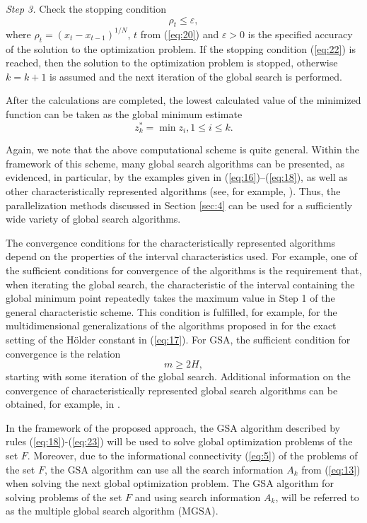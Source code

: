 \documentclass[review]{elsarticle}
\begin{document}
\textit{Step 3.} Check the stopping condition 
\begin{equation}\label{eq:22}
\rho_t \leq \varepsilon,	
\end{equation}
where $\rho_t=(x_t-x_{t-1})^{1/N}$, $t$ from (\ref{eq:20}) and $\varepsilon > 0$ is the specified accuracy of the solution to the optimization problem. If the stopping condition (\ref{eq:22}) is reached, then the solution to the optimization problem is stopped, otherwise $k=k+1$ is assumed and the next iteration of the global search is performed. 

After the calculations are completed, the lowest calculated value of the minimized function can be taken as the global minimum estimate
\begin{equation}\label{eq:23}
z_k^*=\min{z_i}, 1 \leq i \leq k.
\end{equation}

Again, we note that the above computational scheme is quite general. Within the framework of this scheme, many global search algorithms can be presented, as evidenced, in particular, by the examples given in (\ref{eq:16})--(\ref{eq:18}), as well as other characteristically represented algorithms (see, for example, \cite{c22,c23,c24,c25,c26,c27,c28,c29,c30,c31}). Thus, the parallelization methods discussed in Section \ref{sec:4} can be used for a sufficiently wide variety of global search algorithms.

The convergence conditions for the characteristically represented algorithms depend on the properties of the interval characteristics used. For example, one of the sufficient conditions for convergence of the algorithms is the requirement that, when iterating the global search, the characteristic of the interval containing the global minimum point repeatedly takes the maximum value in Step 1 of the general characteristic scheme. This condition is fulfilled, for example, for the multidimensional generalizations of the algorithms proposed in \cite{c22,c23} for the exact setting of the H\"older constant in (\ref{eq:17}). For GSA, the sufficient condition for convergence is the relation \cite{c5}
\begin{equation}\label{eq:24}
m \geq 2H,
\end{equation}
starting with some iteration of the global search. Additional information on the convergence of characteristically represented global search algorithms can be obtained, for example, in \cite{c5}. 

In the framework of the proposed approach, the GSA algorithm described by rules (\ref{eq:18})-(\ref{eq:23}) will be used to solve global optimization problems of the set $F$. Moreover, due to the informational connectivity (\ref{eq:5}) of the problems of the set $F$, the GSA algorithm can use all the search information $A_k$ from (\ref{eq:13}) when solving the next global optimization problem. The GSA algorithm for solving problems of the set $F$ and using search information $A_k$, will be referred to as the multiple global search algorithm (MGSA). 
\end{document}
